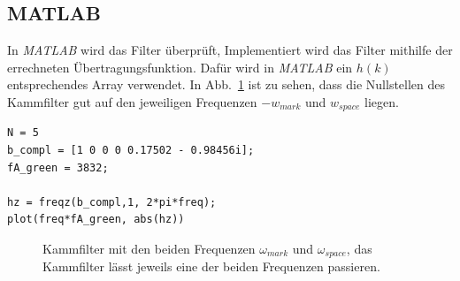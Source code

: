 \documentclass{article}
\begin{document}
\subsection{MATLAB}
In \textit{MATLAB} wird das Filter überprüft, Implementiert wird das Filter mithilfe der errechneten Übertragungsfunktion.
Dafür wird in \textit{MATLAB} ein $h(k)$ entsprechendes Array verwendet. In Abb.~\ref{fig:comb} ist zu sehen,
dass die Nullstellen des Kammfilter gut auf den jeweiligen Frequenzen $- w_{mark}$ und $w_{space}$ liegen.

\begin{listing}
   \label{codeM:comb}
  \caption{In MATLAB wird Überprüft ob die Berechnung des $N$ korrekt sind, indem das Filter mit den Frequenzen
 $w_{mark}$ und $w_{space}$ geplottet wird, siehe Abb.~\ref{fig:comb}. Es wird kontrolliert ob die Nullstellen in den richten Punkten auf der Frequenzachse liegen.}
\begin{verbatim}
N = 5
b_compl = [1 0 0 0 0.17502 - 0.98456i];
fA_green = 3832;

hz = freqz(b_compl,1, 2*pi*freq);
plot(freq*fA_green, abs(hz))

\end{verbatim}
\end{listing}

\begin{figure}[!h]
    \label{fig:comb}
    \centering
 
    \def\svgwidth{1.2\columnwidth}
    
    \caption{Kammfilter mit den beiden Frequenzen $\omega_{mark}$ und $\omega_{space}$, das Kammfilter lässt jeweils eine der beiden Frequenzen passieren.}
\end{figure}
\end{document}
